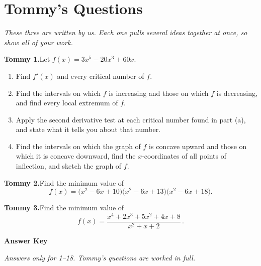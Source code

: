 \documentclass[11pt]{article}
\newcommand{\wsM}{\vspace*{4.5cm}}  %
\newcommand{\wsL}{\vspace*{6.5cm}}  %
\begin{document}
\clearpage
\section*{Tommy's Questions}
\noindent\textit{These three are written by us. Each one pulls several ideas together at
once, so show all of your work.}
\medskip

\noindent\textbf{Tommy 1.}\quad Let $f(x)=3x^{5}-20x^{3}+60x$.
\begin{enumerate}[label=\textbf{(\alph*)},leftmargin=2.8em,itemsep=6pt,topsep=5pt]
  \item Find $f'(x)$ and every critical number of $f$. \wsM
  \item Find the intervals on which $f$ is increasing and those on which $f$ is
        decreasing, and find every local extremum of $f$. \wsM
  \item Apply the second derivative test at each critical number found in part (a), and
        state what it tells you about that number. \wsM
  \item Find the intervals on which the graph of $f$ is concave upward and those on which
        it is concave downward, find the $x$-coordinates of all points of inflection, and
        sketch the graph of $f$. \wsL
\end{enumerate}

\clearpage

\noindent\textbf{Tommy 2.}\quad Find the minimum value of
\[
  f(x)=\bigl(x^{2}-6x+10\bigr)\bigl(x^{2}-6x+13\bigr)\bigl(x^{2}-6x+18\bigr).
\]
\wsL
\wsL

\clearpage

\noindent\textbf{Tommy 3.}\quad Find the minimum value of
\[
  f(x)=\frac{x^{4}+2x^{3}+5x^{2}+4x+8}{x^{2}+x+2}\,.
\]
\wsL
\wsL

\clearpage
\begin{center}\Large\textbf{Answer Key}\end{center}
\medskip
\noindent\textit{Answers only for 1--18. Tommy's questions are worked in full.}
\medskip
\end{document}
